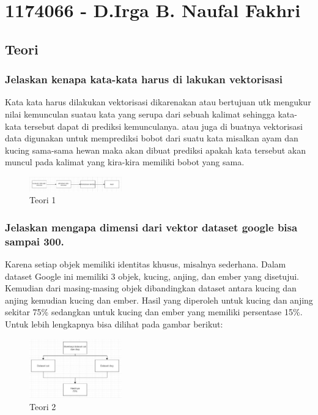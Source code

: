 \section{1174066 - D.Irga B. Naufal Fakhri}
\subsection{Teori}
\subsubsection{Jelaskan kenapa kata-kata harus di lakukan vektorisasi}

\hfill\break
Kata kata harus dilakukan vektorisasi dikarenakan atau bertujuan utk mengukur nilai kemunculan suatau kata yang serupa dari sebuah kalimat sehingga kata-kata tersebut dapat di prediksi kemunculanya. atau juga di buatnya vektorisasi data digunakan untuk memprediksi bobot dari suatu kata misalkan ayam dan kucing sama-sama hewan maka akan dibuat prediksi apakah kata tersebut akan muncul pada kalimat yang kira-kira memiliki bobot yang sama.
\begin{figure}[H]
\includegraphics[width=4cm]{figures/1174066/5/1.jpg}
\centering
\caption{Teori 1}
\end{figure}

\subsubsection{Jelaskan mengapa dimensi dari vektor dataset google bisa sampai 300.}

\hfill\break
Karena setiap objek memiliki identitas khusus, misalnya sederhana. Dalam dataset Google ini memiliki 3 objek, kucing, anjing, dan ember yang disetujui. Kemudian dari masing-masing objek dibandingkan dataset antara kucing dan anjing kemudian kucing dan ember. Hasil yang diperoleh untuk kucing dan anjing sekitar 75\% sedangkan untuk kucing dan ember yang memiliki persentase 15\%. Untuk lebih lengkapnya bisa dilihat pada gambar berikut: 
\begin{figure}[H]
\includegraphics[width=4cm]{figures/1174066/5/2.jpg}
\centering
\caption{Teori 2}
\end{figure}

